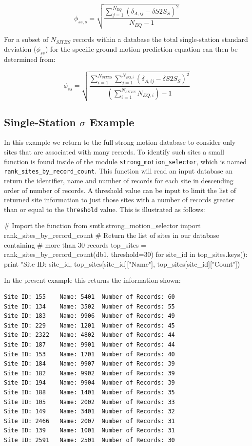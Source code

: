 \begin{equation}
\phi_{ss,s} = \sqrt{\frac{\sum\limits_{j=1}^{N_{EQ}} \left( {\delta_{A,ij} - \delta S2S_S} \right)^2 }{N_{EQ} - 1}}
\end{equation}

For a subset of $N_{SITES}$ records within a database the total single-station standard deviation ($\phi_{ss}$) for the specific ground motion prediction equation can then be determined from:

\begin{equation}
\phi_{ss} = \sqrt{\frac{\sum\limits_{i=1}^{N_{SITES}} \sum\limits_{j=1}^{N_{EQ,i}} \left( {\delta_{A,ij} - \delta S2S_S} \right)^2}{\left( {\sum\limits_{i=1}^{N_{SITES}}} N_{EQ,i} \right) - 1}}
\end{equation}

\subsection{Single-Station $\sigma$ Example}

In this example we return to the full strong motion database to consider only sites that are associated with many records. To identify such sites a small function is found inside of the module \verb=strong_motion_selector=, which is named \verb=rank_sites_by_record_count=. This function will read an input database an return the identifier, name and number of records for each site in descending order of number of records. A threshold value can be input to limit the list of returned site information to just those sites with a number of records greater than or equal to the \verb=threshold= value. This is illustrated as follows:

\begin{python}
# Import the function
from smtk.strong_motion_selector import rank_sites_by_record_count
# Return the list of sites in our database containing
# more than 30 records
top_sites = rank_sites_by_record_count(db1, threshold=30)
for site_id in top_sites.keys():
    print "Site ID: %
        site_id,
        top_sites[site_id]["Name"],
        top_sites[site_id]["Count"])
\end{python}

\noindent In the present example this returns the information shown:

\begin{verbatim}
Site ID: 155    Name: 5401  Number of Records: 60
Site ID: 134    Name: 3502  Number of Records: 55
Site ID: 183    Name: 9906  Number of Records: 49
Site ID: 229    Name: 1201  Number of Records: 45
Site ID: 2322   Name: 4802  Number of Records: 44
Site ID: 187    Name: 9901  Number of Records: 44
Site ID: 153    Name: 1701  Number of Records: 40
Site ID: 184    Name: 9907  Number of Records: 39
Site ID: 182    Name: 9902  Number of Records: 39
Site ID: 194    Name: 9904  Number of Records: 39
Site ID: 188    Name: 1401  Number of Records: 35
Site ID: 105    Name: 2002  Number of Records: 33
Site ID: 149    Name: 3401  Number of Records: 32
Site ID: 2466   Name: 2007  Number of Records: 31
Site ID: 139    Name: 1001  Number of Records: 31
Site ID: 2591   Name: 2501  Number of Records: 30
\end{verbatim}

